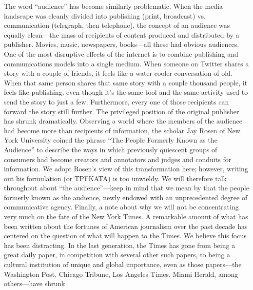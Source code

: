 The word ``audience'' has become similarly problematic. When the media landscape
was cleanly divided into publishing (print, broadcast) vs. communication
(telegraph, then telephone), the concept of an audience was equally clean—the
mass of recipients of content produced and distributed by a publisher. Movies,
music, newspapers, books—all these had obvious audiences.
One of the most disruptive effects of the internet is to combine publishing and
communications models into a single medium. When someone on Twitter shares
a story with a couple of friends, it feels like a water cooler conversation of old.
When that same person shares that same story with a couple thousand people,
it feels like publishing, even though it’s the same tool and the same activity used
to send the story to just a few. Furthermore, every one of those recipients can
forward the story still further. The privileged position of the original publisher
has shrunk dramatically.
Observing a world where the members of the audience had become more than
recipients of information, the scholar Jay Rosen of New York University coined
the phrase ``The People Formerly Known as the Audience'' to describe the ways
in which previously quiescent groups of consumers had become creators and
annotators and judges and conduits for information. We adopt Rosen’s view of
this transformation here; however, writing out his formulation (or TPFKATA) is
too unwieldy.
We will therefore talk throughout about ``the audience''—keep in mind that we
mean by that the people formerly known as the audience, newly endowed with
an unprecedented degree of communicative agency.
Finally, a note about why we will not be concentrating very much on the fate of
the New York Times. A remarkable amount of what has been written about the
fortunes of American journalism over the past decade has centered on the question
of what will happen to the Times. We believe this focus has been distracting.
In the last generation, the Times has gone from being a great daily paper, in
competition with several other such papers, to being a cultural institution of
unique and global importance, even as those papers—the Washington Post, Chicago
Tribune, Los Angeles Times, Miami Herald, among others—have shrunk

